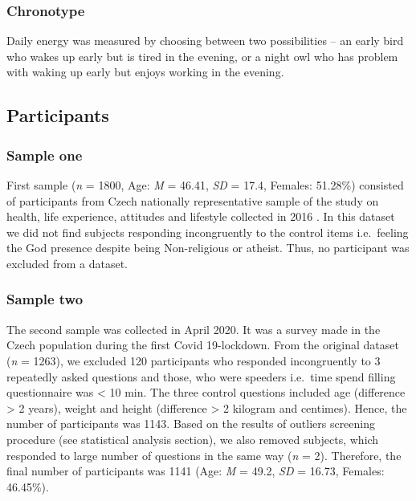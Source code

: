 \documentclass[ijerph,article,accept,moreauthors,pdftex]{mdpi}
\begin{document}
\hypertarget{chronotype}{%
\subsubsection{Chronotype}\label{chronotype}}

Daily energy was measured by choosing between two possibilities -- an
early bird who wakes up early but is tired in the evening, or a night
owl who has problem with waking up early but enjoys working in the
evening.

\hypertarget{participants}{%
\subsection{Participants}\label{participants}}

\hypertarget{sample-one}{%
\subsubsection{Sample one}\label{sample-one}}

First sample (\emph{n} = 1800, Age: \emph{M} = 46.41, \emph{SD} = 17.4,
Females: 51.28\%) consisted of participants from Czech nationally
representative sample of the study on health, life experience, attitudes
and lifestyle collected in 2016 \citep{malinakova2020religiosity}. In
this dataset we did not find subjects responding incongruently to the
control items i.e.~feeling the God presence despite being Non-religious
or atheist. Thus, no participant was excluded from a dataset.

\hypertarget{sample-two}{%
\subsubsection{Sample two}\label{sample-two}}

The second sample was collected in April 2020. It was a survey made in
the Czech population during the first Covid 19-lockdown. From the
original dataset (\emph{n} = 1263), we excluded 120 participants who
responded incongruently to 3 repeatedly asked questions and those, who
were speeders i.e.~time spend filling questionnaire was \textless{} 10
min. The three control questions included age (difference \textgreater{}
2 years), weight and height (difference \textgreater{} 2 kilogram and
centimes). Hence, the number of participants was 1143. Based on the
results of outliers screening procedure (see statistical analysis
section), we also removed subjects, which responded to large number of
questions in the same way (\emph{n} = 2). Therefore, the final number of
participants was 1141 (Age: \emph{M} = 49.2, \emph{SD} = 16.73, Females:
46.45\%).
\end{document}

